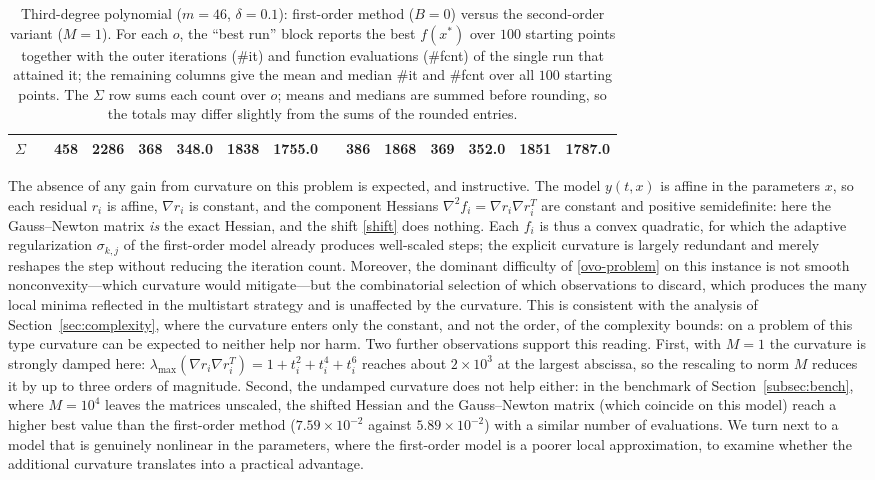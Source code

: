 \documentclass[11pt]{article}
\begin{document}
\begin{table}[ht!]
{\begin{tabular}{c ccc cc cc ccc cc cc}
\hline
$\Sigma$ & & 458 & 2286 & 368 & 348.0 & 1838 & 1755.0 & & 386 & 1868 & 369 & 352.0 & 1851 & 1787.0 \\
\hline
\end{tabular}%
}
\caption{Third-degree polynomial ($m=46$, $\delta=0.1$): first-order method
($B=0$) versus the second-order variant ($M=1$). For each $o$, the ``best run''
block reports the best $f(x^*)$ over $100$ starting points together with the
outer iterations (\#it) and function evaluations (\#fcnt) of the single run that
attained it; the remaining columns give the mean and median \#it and \#fcnt over
all $100$ starting points. The $\Sigma$ row sums each count over $o$; means and medians
are summed before rounding, so the totals may differ slightly from the sums of
the rounded entries.}
\label{tab:poly}
\end{table}

The absence of any gain from curvature on this problem is expected, and
instructive. The model $y(t,x)$ is affine in the parameters $x$, so each
residual $r_i$ is affine, $\nabla r_i$ is constant, and the component Hessians
$\nabla^2 f_i=\nabla r_i\nabla r_i^T$ are constant and positive semidefinite:
here the Gauss--Newton matrix \emph{is} the exact Hessian, and the shift
\eqref{shift} does nothing. Each $f_i$ is thus a convex
quadratic, for which the adaptive regularization $\sigma_{k,j}$ of the
first-order model already produces well-scaled steps; the explicit curvature is
largely redundant and merely reshapes the step without reducing the iteration
count. Moreover, the dominant difficulty of \eqref{ovo-problem} on this
instance is not smooth nonconvexity---which curvature would mitigate---but the
combinatorial selection of which observations to discard, which produces the
many local minima reflected in the multistart strategy and is unaffected by
the curvature. This is consistent with the analysis of Section~\ref{sec:complexity},
where the curvature enters only the constant, and not the order, of the complexity
bounds: on a problem of this type curvature can be expected to neither help nor
harm. Two further observations support this reading. First, with $M=1$ the
curvature is strongly damped here: $\lambda_{\max}(\nabla r_i\nabla r_i^T) =
1+t_i^2+t_i^4+t_i^6$ reaches about $2\times10^3$ at the largest abscissa, so
the rescaling to norm $M$ reduces it by up to three orders of magnitude. Second,
the undamped curvature does not help either: in the benchmark of
Section~\ref{subsec:bench}, where $M=10^4$ leaves the matrices unscaled, the
shifted Hessian and the Gauss--Newton matrix (which coincide on this model)
reach a higher best value than the first-order method ($7.59 \times 10^{-2}$
against $5.89 \times 10^{-2}$) with a similar number of evaluations. We turn next to a model that is genuinely nonlinear in the parameters, where
the first-order model is a poorer local approximation, to examine whether the
additional curvature translates into a practical advantage.
\end{document}
